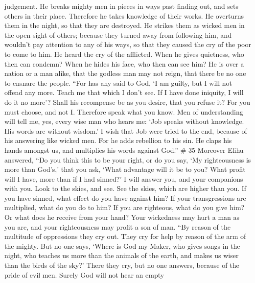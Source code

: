 judgement.  He breaks mighty men in pieces in ways past
finding out, and sets others in their place.  Therefore he
takes knowledge of their works. He overturns them in the night, so that
they are destroyed.  He strikes them as wicked men in the
open sight of others;  because they turned away from
following him, and wouldn't pay attention to any of his ways,
 so that they caused the cry of the poor to come to him. He
heard the cry of the afflicted.  When he gives quietness,
who then can condemn? When he hides his face, who then can see him? He
is over a nation or a man alike,  that the godless man may
not reign, that there be no one to ensnare the people. 
``For has any said to God, `I am guilty, but I will not offend any more.
 Teach me that which I don't see. If I have done iniquity,
I will do it no more'?  Shall his recompense be as you
desire, that you refuse it? For you must choose, and not I. Therefore
speak what you know.  Men of understanding will tell me,
yes, every wise man who hears me:  `Job speaks without
knowledge. His words are without wisdom.'  I wish that Job
were tried to the end, because of his answering like wicked men.
 For he adds rebellion to his sin. He claps his hands
amongst us, and multiplies his words against God.'' \# 35 
Moreover Elihu answered,  ``Do you think this to be your
right, or do you say, `My righteousness is more than God's,'
 that you ask, `What advantage will it be to you? What
profit will I have, more than if I had sinned?'  I will
answer you, and your companions with you.  Look to the
skies, and see. See the skies, which are higher than you. 
If you have sinned, what effect do you have against him? If your
transgressions are multiplied, what do you do to him?  If
you are righteous, what do you give him? Or what does he receive from
your hand?  Your wickedness may hurt a man as you are, and
your righteousness may profit a son of man.  ``By reason of
the multitude of oppressions they cry out. They cry for help by reason
of the arm of the mighty.  But no one says, `Where is God
my Maker, who gives songs in the night,  who teaches us
more than the animals of the earth, and makes us wiser than the birds of
the sky?'  There they cry, but no one answers, because of
the pride of evil men.  Surely God will not hear an empty
